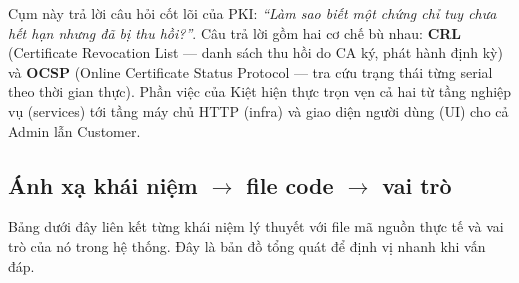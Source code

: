 \documentclass[12pt,a4paper]{article}
\begin{document}
Cụm này trả lời câu hỏi cốt lõi của PKI: \emph{``Làm sao biết một chứng chỉ tuy
chưa hết hạn nhưng đã bị thu hồi?''}. Câu trả lời gồm hai cơ chế bù nhau:
\textbf{CRL} (Certificate Revocation List --- danh sách thu hồi do CA ký, phát
hành định kỳ) và \textbf{OCSP} (Online Certificate Status Protocol --- tra cứu
trạng thái từng serial theo thời gian thực). Phần việc của Kiệt hiện thực trọn
vẹn cả hai từ tầng nghiệp vụ (services) tới tầng máy chủ HTTP (infra) và giao
diện người dùng (UI) cho cả Admin lẫn Customer.

\subsection{Ánh xạ khái niệm $\to$ file code $\to$ vai trò}

Bảng dưới đây liên kết từng khái niệm lý thuyết với file mã nguồn thực tế và vai
trò của nó trong hệ thống. Đây là bản đồ tổng quát để định vị nhanh khi vấn đáp.
\end{document}
